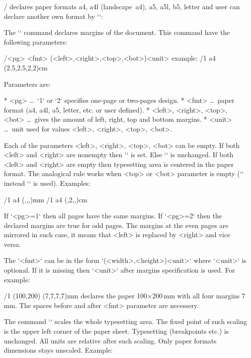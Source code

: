 {\OpTeX/ declares paper formats a4, a4l (landscape~a4), a5, a5l, b5, letter and
user can declare another own format by `\sdef`:

\begtt
{} 
\endtt

The `\margins` command declares margins of the document. This command have
the following parameters:

\begtt
\margins/<pg> <fmt> (<left>,<right>,<top>,<bot>)<unit>
  example:
\margins/1 a4 (2.5,2.5,2,2)cm
\endtt

Parameters are:

\begitems
* <pg> \dots\ `1` or `2` specifies one-page or two-pages design.
* <fmt> \dots\ paper format (a4, a4l, a5, letter, etc. or user defined).
* <left>, <right>, <top>, <bot> \dots\ gives the amount of left, right,
      top and bottom margins.
* <unit> \dots\ unit used for values <left>, <right>, <top>, <bot>.
\enditems

Each of the parameters <left>, <right>, <top>, <bot> can be empty.
If both <left> and <right> are nonempty then `\hsize` is set. Else `\hsize`
is unchanged. If both <left> and <right> are empty then typesetting area is
centered in the paper format. The analogical rule works when <top> or <bot>
parameter is empty (`\vsize` instead `\hsize` is used). Examples:

\begtt
\margins/1 a4 (,,,)mm   %
\margins/1 a4 (,2,,)cm  %
\endtt

If `<pg>=1` then all pages have the same margins. If `<pg>=2` then the
declared margins are true for odd pages. The margins at the even pages are
mirrored in such case, it means that <left> is replaced by <right> and vice
versa.

The `<fmt>` can be in the form `(<width>,<height>)<unit>` where `<unit>` is
optional. If it is missing then `<unit>` after margins specification is
used. For example:

\begtt
\margins/1 (100,200) (7,7,7,7)mm
\endtt
%
declares the paper 100$\times$200\,mm with all four margins 7\,mm. The spaces
before and after <fmt> parameter are necessery.

The command `\magscale[<factor>]` scales the whole typesetting area. 
\new The fixed point of such scaling is the upper left corner of the paper sheet. 
Typesetting (breakpoints etc.) is unchanged. All units are relative after
such scaling. Only paper formats dimensions stays unscaled. Example:

}

